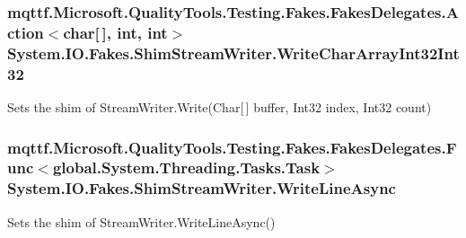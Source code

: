 \hypertarget{class_system_1_1_i_o_1_1_fakes_1_1_shim_stream_writer_a7a39b0401644e1cc5d5dabb52a8afeee}{
\subsubsection[{Write\-Char\-Array\-Int32\-Int32}]{\setlength{\rightskip}{0pt plus 5cm}mqttf.\-Microsoft.\-Quality\-Tools.\-Testing.\-Fakes.\-Fakes\-Delegates.\-Action$<$char\mbox{[}$\,$\mbox{]}, int, int$>$ System.\-I\-O.\-Fakes.\-Shim\-Stream\-Writer.\-Write\-Char\-Array\-Int32\-Int32\hspace{0.3cm}{\ttfamily [set]}}}\label{class_system_1_1_i_o_1_1_fakes_1_1_shim_stream_writer_a7a39b0401644e1cc5d5dabb52a8afeee}


Sets the shim of Stream\-Writer.\-Write(\-Char\mbox{[}$\,$\mbox{]} buffer, Int32 index, Int32 count)

\hypertarget{class_system_1_1_i_o_1_1_fakes_1_1_shim_stream_writer_a63c3317a67aa741c58087ce1da7ba65e}{
\subsubsection[{Write\-Line\-Async}]{\setlength{\rightskip}{0pt plus 5cm}mqttf.\-Microsoft.\-Quality\-Tools.\-Testing.\-Fakes.\-Fakes\-Delegates.\-Func$<$global.\-System.\-Threading.\-Tasks.\-Task$>$ System.\-I\-O.\-Fakes.\-Shim\-Stream\-Writer.\-Write\-Line\-Async\hspace{0.3cm}{\ttfamily [set]}}}\label{class_system_1_1_i_o_1_1_fakes_1_1_shim_stream_writer_a63c3317a67aa741c58087ce1da7ba65e}


Sets the shim of Stream\-Writer.\-Write\-Line\-Async()

